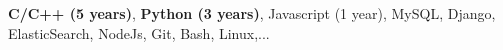 \begin{cvempty} %
    \begin{cvitems} %
        \item{\textbf{C/C++ (5 years)}, \textbf{Python (3 years)}, Javascript (1 year), MySQL, Django, ElasticSearch, NodeJs, Git, Bash, Linux,...}
    \end{cvitems}

\end{cvempty}
